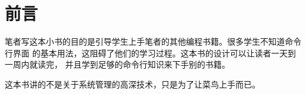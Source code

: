 \chapter*{前言}

笔者写这本小书的目的是引导学生上手笔者的其他编程书籍。很多学生不知道命令行界面
的基本用法，这阻碍了他们的学习过程。这本书的设计可以让读者一天到一周内就读完，
并且学到足够的命令行知识来下手别的书籍。

这本书讲的不是关于系统管理的高深技术，只是为了让菜鸟上手而已。